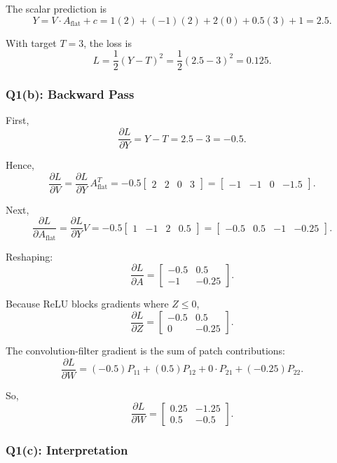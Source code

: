 \documentclass[11pt]{article}
\begin{document}
The scalar prediction is
\[
Y=V\cdot A_{\text{flat}}+c
=1(2)+(-1)(2)+2(0)+0.5(3)+1
=2.5.
\]

With target \(T=3\), the loss is
\[
L=\frac{1}{2}(Y-T)^2
=\frac{1}{2}(2.5-3)^2
=0.125.
\]

\subsubsection*{Q1(b): Backward Pass}

First,
\[
\frac{\partial L}{\partial Y}=Y-T=2.5-3=-0.5.
\]

Hence,
\[
\frac{\partial L}{\partial V}
=\frac{\partial L}{\partial Y}\,A_{\text{flat}}^{T}
=-0.5
\begin{bmatrix}
2 & 2 & 0 & 3
\end{bmatrix}
=
\begin{bmatrix}
-1 & -1 & 0 & -1.5
\end{bmatrix}.
\]

Next,
\[
\frac{\partial L}{\partial A_{\text{flat}}}
=\frac{\partial L}{\partial Y}V
=-0.5
\begin{bmatrix}
1 & -1 & 2 & 0.5
\end{bmatrix}
=
\begin{bmatrix}
-0.5 & 0.5 & -1 & -0.25
\end{bmatrix}.
\]

Reshaping:
\[
\frac{\partial L}{\partial A}=
\begin{bmatrix}
-0.5 & 0.5\\
-1 & -0.25
\end{bmatrix}.
\]

Because ReLU blocks gradients where \(Z\le 0\),
\[
\frac{\partial L}{\partial Z}
=
\begin{bmatrix}
-0.5 & 0.5\\
0 & -0.25
\end{bmatrix}.
\]

The convolution-filter gradient is the sum of patch contributions:
\[
\frac{\partial L}{\partial W}
=
\left(-0.5\right)P_{11}
+\left(0.5\right)P_{12}
+0\cdot P_{21}
+\left(-0.25\right)P_{22}.
\]

So,
\[
\frac{\partial L}{\partial W}
=
\begin{bmatrix}
0.25 & -1.25\\
0.5 & -0.5
\end{bmatrix}.
\]

\subsubsection*{Q1(c): Interpretation}
\end{document}
